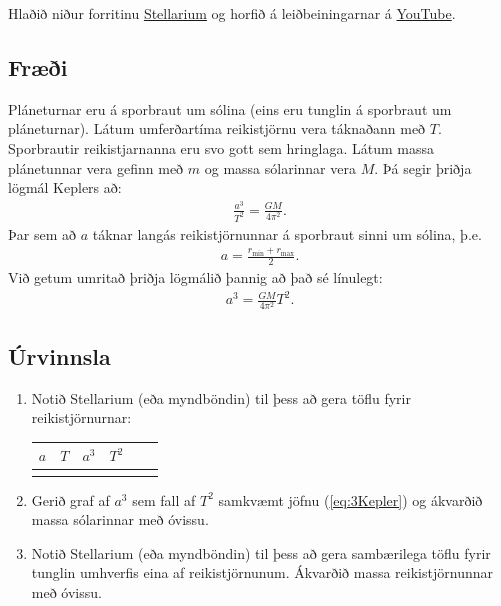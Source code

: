 \documentclass[oneside]{book}
\theoremstyle{definition}
\begin{document}
Hlaðið niður forritinu \href{http://stellarium.org/}{Stellarium} og horfið á leiðbeiningarnar á \href{https://youtu.be/6xKXgL1irsY}{YouTube}.

\subsection*{Fræði}

Pláneturnar eru á sporbraut um sólina (eins eru tunglin á sporbraut um pláneturnar). Látum umferðartíma reikistjörnu vera táknaðann með $T$. Sporbrautir reikistjarnanna eru svo gott sem hringlaga. Látum massa plánetunnar vera gefinn með $m$ og massa sólarinnar vera $M$. Þá segir þriðja lögmál Keplers að:
\begin{align*}
    \frac{a^3}{T^2} = \frac{GM}{4\pi^2}.
\end{align*}
Þar sem að $a$ táknar langás reikistjörnunnar á sporbraut sinni um sólina, þ.e.
\begin{align*}
    a = \frac{r_{\text{min}}+r_{\text{max}}}{2}.
\end{align*}
Við getum umritað þriðja lögmálið þannig að það sé línulegt:
\begin{align} \label{eq:3Kepler}
    a^3 = \frac{GM}{4\pi^2}T^2.
\end{align}

\subsection*{Úrvinnsla}

\begin{enumerate}[label = (\roman*)]
    \item Notið Stellarium (eða myndböndin) til þess að gera töflu fyrir reikistjörnurnar:
    \begin{table}[H]
    \centering
    \begin{tabular}{|c|c|c|c|c|c|}
    \hline
       $a$ & $T$ & $a^3$ & $T^2$  \\ \hline
      & & & \\\hline
    \end{tabular}
\end{table}
    \item Gerið graf af $a^3$ sem fall af $T^2$ samkvæmt jöfnu (\ref{eq:3Kepler}) og ákvarðið massa sólarinnar með óvissu.
    \item Notið Stellarium (eða myndböndin) til þess að gera sambærilega töflu fyrir tunglin umhverfis eina af reikistjörnunum. Ákvarðið massa reikistjörnunnar með óvissu.
\end{enumerate}



\newpage
\end{document}
